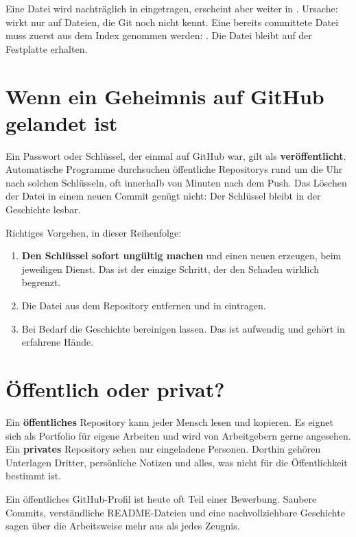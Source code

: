 \begin{fehler}
Eine Datei wird nachträglich in  eingetragen, erscheint aber weiter in
. Ursache:  wirkt nur auf Dateien, die Git noch nicht kennt.
Eine bereits committete Datei muss zuerst aus dem Index genommen werden:
. Die Datei bleibt auf der Festplatte erhalten.
\end{fehler}

\section{Wenn ein Geheimnis auf GitHub gelandet ist}

\begin{achtung}
Ein Passwort oder Schlüssel, der einmal auf GitHub war, gilt als \textbf{veröffentlicht}.
Automatische Programme durchsuchen öffentliche Repositorys rund um die Uhr nach solchen
Schlüsseln, oft innerhalb von Minuten nach dem Push. Das Löschen der Datei in einem neuen
Commit genügt nicht: Der Schlüssel bleibt in der Geschichte lesbar.
\end{achtung}

Richtiges Vorgehen, in dieser Reihenfolge:

\begin{enumerate}
  \item \textbf{Den Schlüssel sofort ungültig machen} und einen neuen erzeugen, beim
        jeweiligen Dienst. Das ist der einzige Schritt, der den Schaden wirklich begrenzt.
  \item Die Datei aus dem Repository entfernen und in  eintragen.
  \item Bei Bedarf die Geschichte bereinigen lassen. Das ist aufwendig und gehört in
        erfahrene Hände.
\end{enumerate}

\section{Öffentlich oder privat?}

Ein \textbf{öffentliches} Repository kann jeder Mensch lesen und kopieren. Es eignet sich als
Portfolio für eigene Arbeiten und wird von Arbeitgebern gerne angesehen. Ein
\textbf{privates} Repository sehen nur eingeladene Personen. Dorthin gehören Unterlagen
Dritter, persönliche Notizen und alles, was nicht für die Öffentlichkeit bestimmt ist.

\begin{erfahrung}
Ein öffentliches GitHub-Profil ist heute oft Teil einer Bewerbung. Saubere Commits,
verständliche README-Dateien und eine nachvollziehbare Geschichte sagen über die Arbeitsweise
mehr aus als jedes Zeugnis.
\end{erfahrung}

